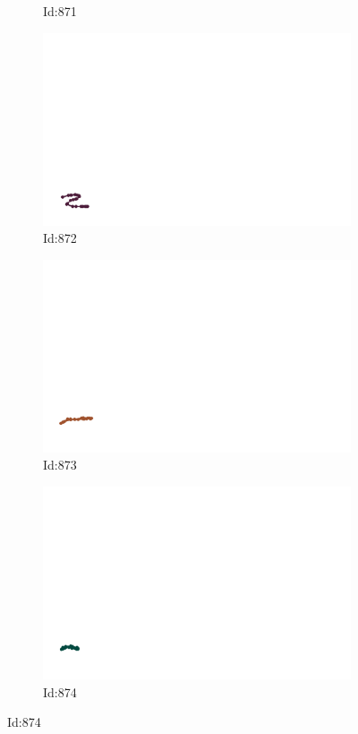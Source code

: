 \documentclass[12pt,twoside]{report}
\begin{document}
\begin{figure}
\begin{subfigure}[b]{0.20\textwidth}
\caption{Id:871}
\end{subfigure}
\begin{subfigure}[b]{0.20\textwidth}
\centering
\includegraphics[width=\textwidth]{../../trajectories/872.png}
\caption{Id:872}
\end{subfigure}
\begin{subfigure}[b]{0.20\textwidth}
\centering
\includegraphics[width=\textwidth]{../../trajectories/873.png}
\caption{Id:873}
\end{subfigure}
\begin{subfigure}[b]{0.20\textwidth}
\centering
\includegraphics[width=\textwidth]{../../trajectories/874.png}
\caption{Id:874}
\end{subfigure}
\end{figure}
\end{document}
